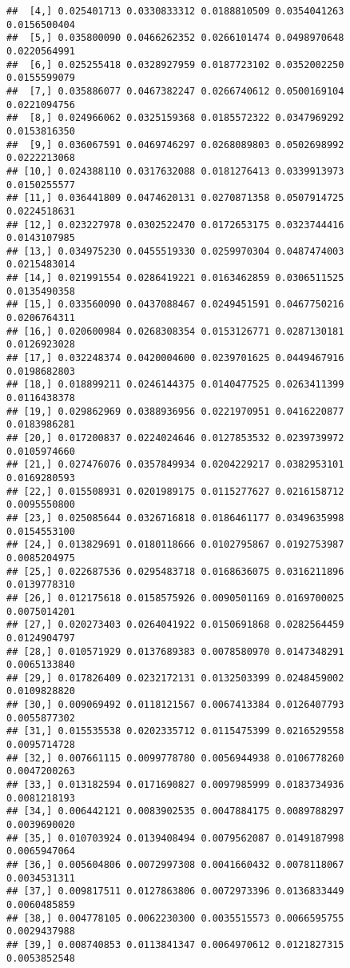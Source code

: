 \documentclass[]{article}
\begin{document}
\begin{verbatim}
##  [4,] 0.025401713 0.0330833312 0.0188810509 0.0354041263 0.0156500404
##  [5,] 0.035800090 0.0466262352 0.0266101474 0.0498970648 0.0220564991
##  [6,] 0.025255418 0.0328927959 0.0187723102 0.0352002250 0.0155599079
##  [7,] 0.035886077 0.0467382247 0.0266740612 0.0500169104 0.0221094756
##  [8,] 0.024966062 0.0325159368 0.0185572322 0.0347969292 0.0153816350
##  [9,] 0.036067591 0.0469746297 0.0268089803 0.0502698992 0.0222213068
## [10,] 0.024388110 0.0317632088 0.0181276413 0.0339913973 0.0150255577
## [11,] 0.036441809 0.0474620131 0.0270871358 0.0507914725 0.0224518631
## [12,] 0.023227978 0.0302522470 0.0172653175 0.0323744416 0.0143107985
## [13,] 0.034975230 0.0455519330 0.0259970304 0.0487474003 0.0215483014
## [14,] 0.021991554 0.0286419221 0.0163462859 0.0306511525 0.0135490358
## [15,] 0.033560090 0.0437088467 0.0249451591 0.0467750216 0.0206764311
## [16,] 0.020600984 0.0268308354 0.0153126771 0.0287130181 0.0126923028
## [17,] 0.032248374 0.0420004600 0.0239701625 0.0449467916 0.0198682803
## [18,] 0.018899211 0.0246144375 0.0140477525 0.0263411399 0.0116438378
## [19,] 0.029862969 0.0388936956 0.0221970951 0.0416220877 0.0183986281
## [20,] 0.017200837 0.0224024646 0.0127853532 0.0239739972 0.0105974660
## [21,] 0.027476076 0.0357849934 0.0204229217 0.0382953101 0.0169280593
## [22,] 0.015508931 0.0201989175 0.0115277627 0.0216158712 0.0095550800
## [23,] 0.025085644 0.0326716818 0.0186461177 0.0349635998 0.0154553100
## [24,] 0.013829691 0.0180118666 0.0102795867 0.0192753987 0.0085204975
## [25,] 0.022687536 0.0295483718 0.0168636075 0.0316211896 0.0139778310
## [26,] 0.012175618 0.0158575926 0.0090501169 0.0169700025 0.0075014201
## [27,] 0.020273403 0.0264041922 0.0150691868 0.0282564459 0.0124904797
## [28,] 0.010571929 0.0137689383 0.0078580970 0.0147348291 0.0065133840
## [29,] 0.017826409 0.0232172131 0.0132503399 0.0248459002 0.0109828820
## [30,] 0.009069492 0.0118121567 0.0067413384 0.0126407793 0.0055877302
## [31,] 0.015535538 0.0202335712 0.0115475399 0.0216529558 0.0095714728
## [32,] 0.007661115 0.0099778780 0.0056944938 0.0106778260 0.0047200263
## [33,] 0.013182594 0.0171690827 0.0097985999 0.0183734936 0.0081218193
## [34,] 0.006442121 0.0083902535 0.0047884175 0.0089788297 0.0039690020
## [35,] 0.010703924 0.0139408494 0.0079562087 0.0149187998 0.0065947064
## [36,] 0.005604806 0.0072997308 0.0041660432 0.0078118067 0.0034531311
## [37,] 0.009817511 0.0127863806 0.0072973396 0.0136833449 0.0060485859
## [38,] 0.004778105 0.0062230300 0.0035515573 0.0066595755 0.0029437988
## [39,] 0.008740853 0.0113841347 0.0064970612 0.0121827315 0.0053852548

\end{verbatim}
\end{document}
